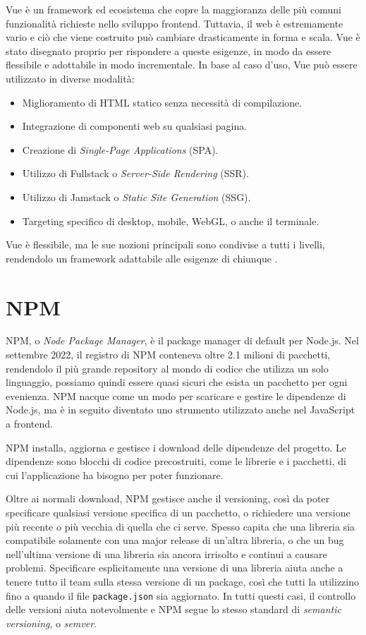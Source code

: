 Vue è un framework ed ecosistema che copre la maggioranza delle più comuni funzionalità richieste nello sviluppo frontend. Tuttavia, il web è estremamente vario e ciò che viene costruito può cambiare drasticamente in forma e scala. Vue è stato disegnato proprio per rispondere a queste esigenze, in modo da essere flessibile e adottabile in modo incrementale. In base al caso d'uso, Vue può essere utilizzato in diverse modalità:
\begin{itemize}
    \item Miglioramento di HTML statico senza necessità di compilazione.
    \item Integrazione di componenti web su qualsiasi pagina.
    \item Creazione di \textit{Single-Page Applications} (SPA).
    \item Utilizzo di Fullstack o \textit{Server-Side Rendering} (SSR).
    \item Utilizzo di Jamstack o \textit{Static Site Generation} (SSG).
    \item Targeting specifico di desktop, mobile, WebGL, o anche il terminale.
\end{itemize}
Vue è flessibile, ma le sue nozioni principali sono condivise a tutti i livelli, rendendolo un framework adattabile alle esigenze di chiunque \cite{Vue}.


\section{NPM}
NPM, o \textit{Node Package Manager}, è il package manager di default per Node.js. Nel settembre 2022, il registro di NPM conteneva oltre 2.1 milioni di pacchetti, rendendolo il più grande repository al mondo di codice che utilizza un solo linguaggio, possiamo quindi essere quasi sicuri che esista un pacchetto per ogni evenienza. NPM nacque come un modo per scaricare e gestire le dipendenze di Node.js, ma è in seguito diventato uno strumento utilizzato anche nel JavaScript a frontend.

NPM installa, aggiorna e gestisce i download delle dipendenze del progetto. Le dipendenze sono blocchi di codice precostruiti, come le librerie e i pacchetti, di cui l'applicazione ha bisogno per poter funzionare.

Oltre ai normali download, NPM gestisce anche il versioning, così da poter specificare qualsiasi versione specifica di un pacchetto, o richiedere una versione più recente o più vecchia di quella che ci serve. Spesso capita che una libreria sia compatibile solamente con una major release di un'altra libreria, o che un bug nell'ultima versione di una libreria sia ancora irrisolto e continui a causare problemi. Specificare esplicitamente una versione di una libreria aiuta anche a tenere tutto il team sulla stessa versione di un package, così che tutti la utilizzino fino a quando il file \Verb_package.json_ sia aggiornato. In tutti questi casi, il controllo delle versioni aiuta notevolmente e NPM segue lo stesso standard di \textit{semantic versioning}, o \textit{semver}.

